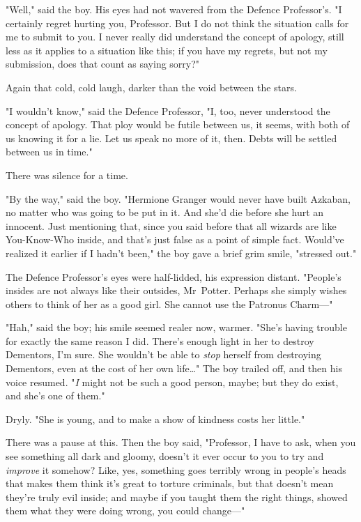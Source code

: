"Well," said the boy. His eyes had not wavered from the Defence Professor's. "I
certainly regret hurting you, Professor. But I do not think the situation calls
for me to submit to you. I never really did understand the concept of apology,
still less as it applies to a situation like this; if you have my regrets, but
not my submission, does that count as saying sorry?"

Again that cold, cold laugh, darker than the void between the stars.

"I wouldn't know," said the Defence Professor, "I, too, never understood the
concept of apology. That ploy would be futile between us, it seems, with both
of us knowing it for a lie. Let us speak no more of it, then. Debts will be
settled between us in time."

There was silence for a time.

"By the way," said the boy. "Hermione Granger would never have built Azkaban,
no matter who was going to be put in it. And she'd die before she hurt an
innocent. Just mentioning that, since you said before that all wizards are like
You-Know-Who inside, and that's just false as a point of simple fact. Would've
realized it earlier if I hadn't been," the boy gave a brief grim smile,
"stressed out."

The Defence Professor's eyes were half-lidded, his expression distant.
"People's insides are not always like their outsides, Mr~Potter. Perhaps she
simply wishes others to think of her as a good girl. She cannot use the
Patronus Charm—"

"Hah," said the boy; his smile seemed realer now, warmer. "She's having trouble
for exactly the same reason I did. There's enough light in her to destroy
Dementors, I'm sure. She wouldn't be able to \emph{stop} herself from
destroying Dementors, even at the cost of her own life…" The boy trailed
off, and then his voice resumed. "\emph{I} might not be such a good person,
maybe; but they do exist, and she's one of them."

Dryly. "She is young, and to make a show of kindness costs her little."

There was a pause at this. Then the boy said, "Professor, I have to ask, when
you see something all dark and gloomy, doesn't it ever occur to you to try and
\emph{improve} it somehow? Like, yes, something goes terribly wrong in people's
heads that makes them think it's great to torture criminals, but that doesn't
mean they're truly evil inside; and maybe if you taught them the right things,
showed them what they were doing wrong, you could change—"

